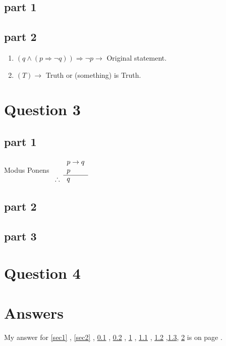 \documentclass[a4paper,12pt]{article} %
\begin{document}
\subsection{part 1} %
\label{sec3}

\subsection{part 2}
\label{sec4}
\begin{enumerate} %
    \item $(q \wedge (p \Rightarrow \neg q)) \Rightarrow \neg p \longrightarrow $ Original statement. %
    \item $(T) \longrightarrow$ Truth or (something) is Truth.
\end{enumerate}

\section{Question 3}
\label{sec5}

\subsection{part 1}
\label{sec6}
Modus Ponens
 $\begin{array}{rl} %
    & p \to q\\
    & p \\
    \cline{2-2}
    \therefore & q
  \end{array}$

\subsection{part 2}
\label{sec7}

\subsection{part 3}
\label{sec9}

\section{Question 4}
\label{sec8}


\section{Answers}
My answer for \ref{sec1} , \ref{sec2} , \ref{sec3} , \ref{sec4} , \ref{sec5} , \ref{sec6} , \ref{sec7} ,\ref{sec9}, \ref{sec8} is on page \pageref{sec1}. %
\end{document}
